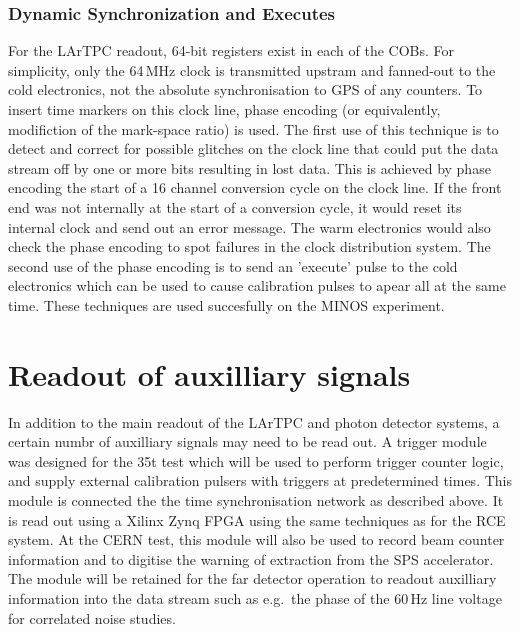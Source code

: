 \subsubsection{Dynamic Synchronization and Executes}

For the LArTPC readout, 64-bit registers exist in each of the COBs.
For simplicity, only the 64\,MHz clock is transmitted upstram and
fanned-out to the cold electronics, not the absolute synchronisation
to GPS of any counters.  To insert time markers on this clock line,
phase encoding (or equivalently, modifiction of the mark-space ratio)
is used.  The first use of this technique is to detect and correct for
possible glitches on the clock line that could put the data stream off
by one or more bits resulting in lost data.  This is achieved by phase
encoding the start of a 16 channel conversion cycle on the clock line.
If the front end was not internally at the start of a conversion
cycle, it would reset its internal clock and send out an error
message.  The warm electronics would also check the phase encoding to
spot failures in the clock distribution system.  The second use of the
phase encoding is to send an 'execute' pulse to the cold electronics
which can be used to cause calibration pulses to apear all at the same
time.  These techniques are used succesfully on the MINOS experiment.

\section{Readout of auxilliary signals}
\label{sec:daq_penn}

In addition to the main readout of the LArTPC and photon detector
systems, a certain numbr of auxilliary signals may need to be read
out.  A trigger module was designed for the 35t test which will be
used to perform trigger counter logic, and supply external calibration
pulsers with triggers at predetermined times.  This module is
connected the the time synchronisation network as described above.  It
is read out using a Xilinx Zynq FPGA using the same techniques as for
the RCE system.   At the CERN test, this module will also be used to
record beam counter information and to digitise the warning of
extraction from the SPS accelerator.  The module will be retained for
the far detector operation to readout auxilliary information into the
data stream such as e.g.\ the phase of the 60\,Hz line voltage for
correlated noise studies.  


